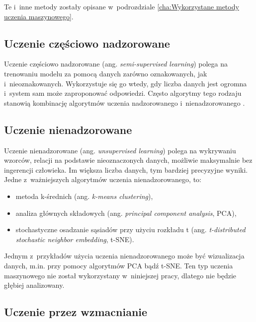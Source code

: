 \noindent Te i~inne metody zostały opisane w~podrozdziale \ref{cha:Wykorzystane metody uczenia maszynowego}. 

\subsection{Uczenie częściowo nadzorowane}
\label{cha:cha3.2.2}

Uczenie częściowo nadzorowane (ang. \textit{semi-supervised learning}) polega na trenowaniu modelu za pomocą danych zarówno oznakowanych, jak i~nieoznakowanych. Wykorzystuje się go wtedy, gdy liczba danych jest ogromna i~system sam może zaproponować odpowiedzi. Często algorytmy tego rodzaju stanowią kombinację algorytmów uczenia nadzorowanego i~nienadzorowanego \cite{Sawka18}.

\subsection{Uczenie nienadzorowane}
\label{cha:cha3.2.3}

Uczenie nienadzorowane (ang. \textit{unsupervised learning}) polega na wykrywaniu wzorców, relacji na podstawie nieoznaczonych danych, możliwie maksymalnie bez ingerencji człowieka. Im większa liczba danych, tym bardziej precyzyjne wyniki. Jedne z~ważniejszych algorytmów uczenia nienadzorowanego, to:
\begin{itemize}
\item
metoda k-średnich (ang. \textit{k-means clustering}),

\item
analiza głównych składowych (ang. \textit{principal component analysis}, PCA),

\item
stochastyczne osadzanie sąsiadów przy użyciu rozkładu t (ang. \textit{t-distributed stochastic neighbor embedding}, t-SNE).
\end{itemize}

\noindent Jednym z~przykładów użycia uczenia nienadzorowanego może być wizualizacja danych, m.in. przy pomocy algorytmów PCA bądź t-SNE. Ten typ uczenia maszynowego nie został wykorzystany w~niniejszej pracy, dlatego nie będzie głębiej analizowany.

\subsection{Uczenie przez wzmacnianie}
\label{cha:cha3.2.4}

